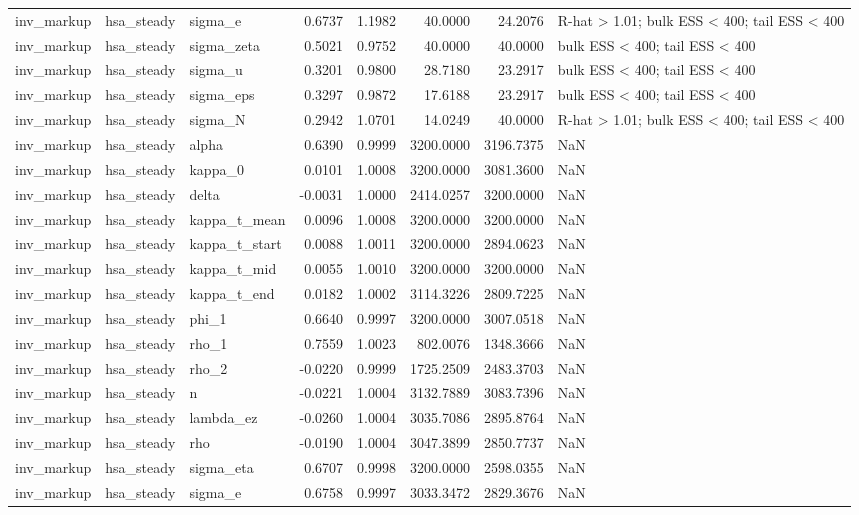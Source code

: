 \begin{tabular}{lllrrrrl}
inv\_markup & hsa\_steady & sigma\_e & 0.6737 & 1.1982 & 40.0000 & 24.2076 & R-hat > 1.01; bulk ESS < 400; tail ESS < 400 \\
inv\_markup & hsa\_steady & sigma\_zeta & 0.5021 & 0.9752 & 40.0000 & 40.0000 & bulk ESS < 400; tail ESS < 400 \\
inv\_markup & hsa\_steady & sigma\_u & 0.3201 & 0.9800 & 28.7180 & 23.2917 & bulk ESS < 400; tail ESS < 400 \\
inv\_markup & hsa\_steady & sigma\_eps & 0.3297 & 0.9872 & 17.6188 & 23.2917 & bulk ESS < 400; tail ESS < 400 \\
inv\_markup & hsa\_steady & sigma\_N & 0.2942 & 1.0701 & 14.0249 & 40.0000 & R-hat > 1.01; bulk ESS < 400; tail ESS < 400 \\
inv\_markup & hsa\_steady & alpha & 0.6390 & 0.9999 & 3200.0000 & 3196.7375 & NaN \\
inv\_markup & hsa\_steady & kappa\_0 & 0.0101 & 1.0008 & 3200.0000 & 3081.3600 & NaN \\
inv\_markup & hsa\_steady & delta & -0.0031 & 1.0000 & 2414.0257 & 3200.0000 & NaN \\
inv\_markup & hsa\_steady & kappa\_t\_mean & 0.0096 & 1.0008 & 3200.0000 & 3200.0000 & NaN \\
inv\_markup & hsa\_steady & kappa\_t\_start & 0.0088 & 1.0011 & 3200.0000 & 2894.0623 & NaN \\
inv\_markup & hsa\_steady & kappa\_t\_mid & 0.0055 & 1.0010 & 3200.0000 & 3200.0000 & NaN \\
inv\_markup & hsa\_steady & kappa\_t\_end & 0.0182 & 1.0002 & 3114.3226 & 2809.7225 & NaN \\
inv\_markup & hsa\_steady & phi\_1 & 0.6640 & 0.9997 & 3200.0000 & 3007.0518 & NaN \\
inv\_markup & hsa\_steady & rho\_1 & 0.7559 & 1.0023 & 802.0076 & 1348.3666 & NaN \\
inv\_markup & hsa\_steady & rho\_2 & -0.0220 & 0.9999 & 1725.2509 & 2483.3703 & NaN \\
inv\_markup & hsa\_steady & n & -0.0221 & 1.0004 & 3132.7889 & 3083.7396 & NaN \\
inv\_markup & hsa\_steady & lambda\_ez & -0.0260 & 1.0004 & 3035.7086 & 2895.8764 & NaN \\
inv\_markup & hsa\_steady & rho & -0.0190 & 1.0004 & 3047.3899 & 2850.7737 & NaN \\
inv\_markup & hsa\_steady & sigma\_eta & 0.6707 & 0.9998 & 3200.0000 & 2598.0355 & NaN \\
inv\_markup & hsa\_steady & sigma\_e & 0.6758 & 0.9997 & 3033.3472 & 2829.3676 & NaN \\

\end{tabular}
